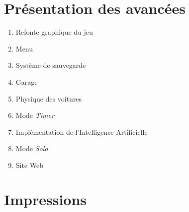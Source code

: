 \documentclass[12pt,a4paper]{article}
\newcommand{\AI}{Intelligence Artificielle}
\begin{document}
  \section{\large \bfseries Présentation des avancées}
  \begin{enumerate}
    \item Refonte graphique du jeu %

    \item Menu %

    \item Système de sauvegarde %

    \item Garage %
    
    \item Physique des voitures %

    \item Mode \textsl{Timer} %

    \item Implémentation de l'\AI %

    \item Mode \textsl{Solo} %

    \item Site Web %

  \end{enumerate}

  \section{\large \bfseries Impressions} %
\end{document}
